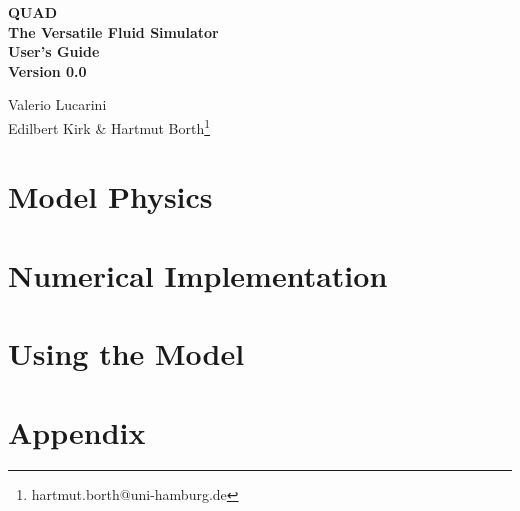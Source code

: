 \documentclass[12pt,twoside,a4paper]{book}
\begin{document}
\begin{titlepage}
\begin{center}
\vspace*{3cm}
{\Huge\bf QUAD} \\
\vspace*{0.5cm}
{\Huge\bf The Versatile Fluid Simulator} \\
\vspace*{1.5cm}
{\huge \bf User's Guide} \\
\vspace*{1cm}
{\huge \bf Version 0.0}
\vspace*{1cm}

{\large 
          Valerio Lucarini 
               \\
 Edilbert Kirk \&  Hartmut Borth\footnote{hartmut.borth@uni-hamburg.de}
}

\end{center}
\end{titlepage}



\tableofcontents

\part{Model Physics}

 

\part{Numerical Implementation}

 

 

 

\part{Using the Model}

 
 
 

 

 

\part{Appendix}

\begin{appendix}

 

 
 
 

\end{appendix}



\begin{appendix}
\end{appendix}
\end{document}
